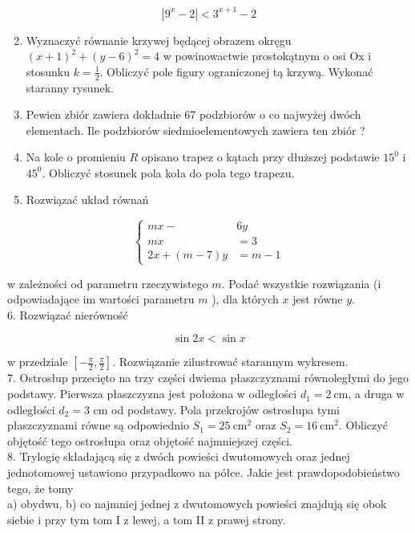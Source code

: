 \documentclass[10pt]{article}
\begin{document}
$$
\left|9^{x}-2\right|<3^{x+1}-2
$$

\begin{enumerate}
  \setcounter{enumi}{1}
  \item Wyznaczyć równanie krzywej będącej obrazem okręgu $(x+1)^{2}+(y-6)^{2}=4$ w powinowactwie prostokątnym o osi Ox i stosunku $k=\frac{1}{2}$. Obliczyć pole figury ograniczonej tą krzywą. Wykonać staranny rysunek.
  \item Pewien zbiór zawiera dokładnie 67 podzbiorów o co najwyżej dwóch elementach. Ile podzbiorów siedmioelementowych zawiera ten zbiór ?
  \item Na kole o promieniu $R$ opisano trapez o kątach przy dłuższej podstawie $15^{0}$ i $45^{0}$. Obliczyć stosunek pola koła do pola tego trapezu.
  \item Rozwiązać układ równań
\end{enumerate}

$$
\left\{\begin{aligned}
m x- & 6 y \\
m x & =3 \\
2 x+(m-7) y & =m-1
\end{aligned}\right.
$$

w zależności od parametru rzeczywistego $m$. Podać wszystkie rozwiązania (i odpowiadające im wartości parametru $m$ ), dla których $x$ jest równe $y$.\\
6. Rozwiązać nierówność

$$
\sin 2 x<\sin x
$$

w przedziale $\left[-\frac{\pi}{2}, \frac{\pi}{2}\right]$. Rozwiązanie zilustrować starannym wykresem.\\
7. Ostrosłup przecięto na trzy części dwiema płaszczyznami równoległymi do jego podstawy. Pierwsza płaszczyzna jest położona w odległości $d_{1}=2 \mathrm{~cm}$, a druga w odległości $d_{2}=3$ cm od podstawy. Pola przekrojów ostrosłupa tymi płaszczyznami równe są odpowiednio $S_{1}=25 \mathrm{~cm}^{2}$ oraz $S_{2}=16 \mathrm{~cm}^{2}$. Obliczyć objętość tego ostrosłupa oraz objętość najmniejszej części.\\
8. Trylogię składającą się z dwóch powieści dwutomowych oraz jednej jednotomowej ustawiono przypadkowo na półce. Jakie jest prawdopodobieństwo tego, że tomy\\
a) obydwu, b) co najmniej jednej z dwutomowych powieści znajdują się obok siebie i przy tym tom I z lewej, a tom II z prawej strony.
\end{document}
